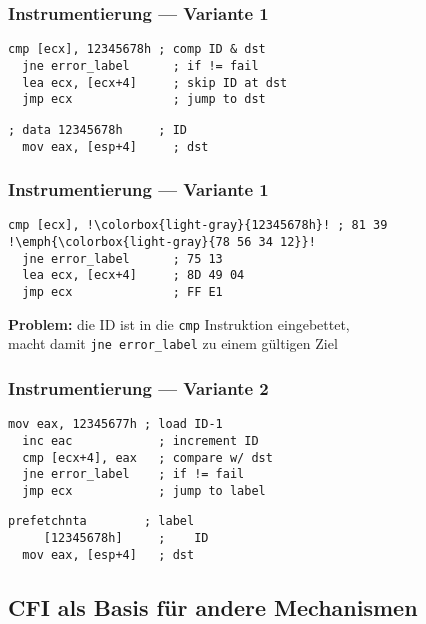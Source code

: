 \documentclass[serif,slidestop,compress,red]{beamer}
\begin{document}
\begin{frame}[fragile]
  \frametitle{Instrumentierung — Variante 1}
  \begin{lstlisting}[title=Quelle]
  cmp [ecx], 12345678h ; comp ID & dst
  jne error_label      ; if != fail
  lea ecx, [ecx+4]     ; skip ID at dst
  jmp ecx              ; jump to dst
  \end{lstlisting}
  \begin{lstlisting}[title=Ziel]
  ; data 12345678h     ; ID
  mov eax, [esp+4]     ; dst
  \end{lstlisting}
\end{frame}


\begin{frame}[fragile]
  \frametitle{Instrumentierung — Variante 1}
  \begin{lstlisting}[title=Quelle,escapechar=!]
  cmp [ecx], !\colorbox{light-gray}{12345678h}! ; 81 39 !\emph{\colorbox{light-gray}{78 56 34 12}}!
  jne error_label      ; 75 13
  lea ecx, [ecx+4]     ; 8D 49 04
  jmp ecx              ; FF E1
  \end{lstlisting}
  \textbf{Problem:} die ID ist in die \texttt{cmp} Instruktion eingebettet, \\ macht
  damit \texttt{jne error\_label} zu einem gültigen Ziel
\end{frame}

\begin{frame}[fragile]
  \frametitle{Instrumentierung — Variante 2}
  \begin{lstlisting}[title=Quelle]
  mov eax, 12345677h ; load ID-1
  inc eac            ; increment ID
  cmp [ecx+4], eax   ; compare w/ dst
  jne error_label    ; if != fail
  jmp ecx            ; jump to label
  \end{lstlisting}
  \begin{lstlisting}[title=Ziel]
  prefetchnta        ; label
     [12345678h]     ;    ID
  mov eax, [esp+4]   ; dst
  \end{lstlisting}
\end{frame}

\subsection{CFI als Basis für andere Mechanismen}
\end{document}
